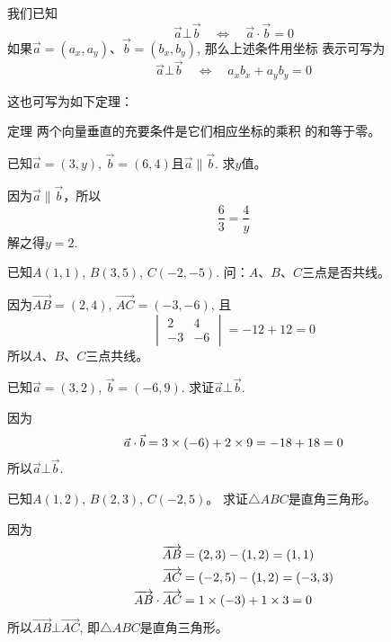 我们已知
\[\vec{a}\bot\vec{b}\quad \Longleftrightarrow \quad \vec{a}\cdot \vec{b}=0\]
如果$\vec{a}=(a_x,a_y)$、$\vec{b}=(b_x,b_y)$, 那么上述条件用坐标
表示可写为
\[\vec{a}\bot\vec{b}\quad \Longleftrightarrow \quad a_xb_x+a_yb_y=0\]

这也可写为如下定理：

\begin{blk}
  {定理} 两个向量垂直的充要条件是它们相应坐标的乘积
的和等于零。  
\end{blk}

\begin{example}
    已知$\vec{a}=(3,y)$, $\vec{b}=(6,4)$且$\vec{a}\parallel \vec{b}$. 求$y$值。
\end{example}

\begin{solution}
    因为$\vec{a}\parallel \vec{b}$，所以
    \[\frac{6}{3}=\frac{4}{y}\]
    解之得$y=2$. 
\end{solution}

\begin{example}
已知$A(1,1)$, $B(3,5)$, $C(-2,-5)$.
问：$A$、$B$、$C$三点是否共线。
\end{example}

\begin{solution}
因为$\Vec{AB}=(2,4)$, $\Vec{AC}=(-3,-6)$,
且
\[\begin{vmatrix}
    2&4\\
    -3&-6
\end{vmatrix}=-12+12=0\]
所以$A$、$B$、$C$三点共线。
\end{solution}
    
\begin{example}
    已知$\vec{a}=(3,2)$, $\vec{b}=(-6,9)$. 求证$\vec{a}\bot\vec{b}$.
\end{example}

\begin{solution}
因为
\[\vec{a}\cdot \vec{b}=3\times (-6)+2\times 9=-18+18=0\]
所以$\vec{a}\bot\vec{b}$.
\end{solution}

\begin{example}
    已知$A(1,2)$, $B(2,3)$, $C(-2,5)$。
    求证$\triangle ABC$是直角三角形。
\end{example}


\begin{solution}
因为
\[\begin{split}
    \overrightarrow{AB}&=(2,3)-(1,2)=(1,1)\\
    \overrightarrow{AC}&=(-2,5)-(1,2)=(-3,3)\\
    \overrightarrow{AB}\cdot \overrightarrow{AC}&=1\times(-3)+1\times3=0
\end{split}\]
    所以$\Vec{AB}\bot \Vec{AC}$, 即$\triangle ABC$是直角三角形。
\end{solution}

